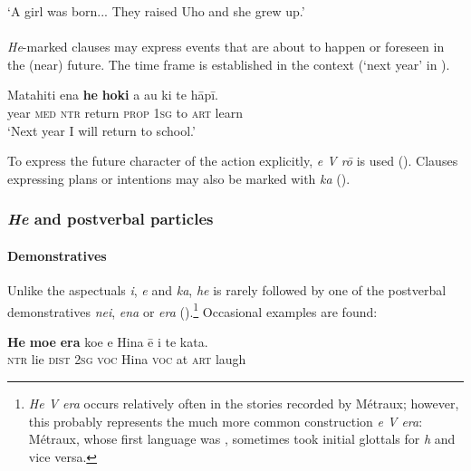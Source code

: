 \glt 
‘A girl was born... They raised Uho and she grew up.’ \textstyleExampleref{[Ley-9-55.026–027]}
\z

\paragraph{}\label{sec:7.2.3.2.4} \textit{He}-marked clauses may express events that are about to happen or foreseen in the (near) future. The time frame is established in the context (‘next year’ in ).

\ea\label{ex:7.10}
\gll Matahiti ena \textbf{he} \textbf{hoki} a au ki te hāpī. \\
year \textsc{med} \textsc{ntr} return \textsc{prop} \textsc{1sg} to \textsc{art} learn \\

\glt
‘Next year I will return to school.’ \textstyleExampleref{[R210.003]} 
\z

To express the future character of the action explicitly, \textit{e V rō} is used (). Clauses expressing plans or intentions may also be marked with \textit{ka} ().

\subsubsection{\textit{He} and postverbal particles}\label{sec:7.2.3.3}

\paragraph{Demonstratives}\label{sec:7.2.3.3.1} Unlike the aspectuals \textit{i}, \textit{e} and \textit{ka}, \textit{he} is rarely followed by one of the postverbal demonstratives \textit{nei}, \textit{ena} or \textit{era} ().\footnote{\label{fn:318}\textit{He V era} occurs relatively often in the stories recorded by Métraux; however, this probably represents the much more common construction \textit{e V era}: Métraux, whose first language was , sometimes took initial glottals for \textit{h} and vice versa.} Occasional examples are found:

\ea\label{ex:7.11}
\gll \textbf{He} \textbf{moe} \textbf{era} koe e Hina ē {\ꞌ}i te kata. \\
\textsc{ntr} lie \textsc{dist} \textsc{2sg} \textsc{voc} Hina \textsc{voc} at \textsc{art} laugh \\

